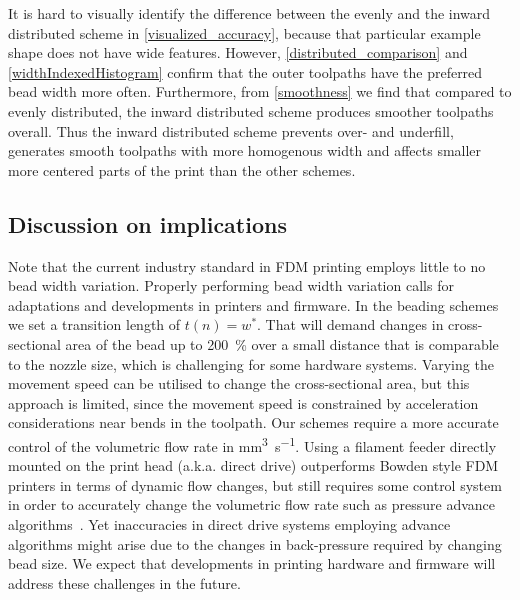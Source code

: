 It is hard to visually identify the difference between the evenly and the inward distributed scheme in \cref{visualized_accuracy}, because that particular example shape does not have wide features.
However, \cref{distributed_comparison} and  \cref{widthIndexedHistogram} confirm that the outer toolpaths have the preferred bead width more often.
Furthermore, from \cref{smoothness} we find that compared to evenly distributed, the inward distributed scheme produces smoother toolpaths overall.
Thus the inward distributed scheme prevents over- and underfill, generates smooth toolpaths with more homogenous width and affects smaller more centered parts of the print than the other schemes. 














\subsection{Discussion on implications}
Note that the current industry standard in FDM printing employs little to no bead width variation.
Properly performing bead width variation calls for adaptations and developments in printers and firmware.
In the beading schemes we set a transition length of $t(n) = w^*$.
That will demand changes in cross-sectional area of the bead up to \SI{200}{\percent} over a small distance that is comparable to the nozzle size, which is challenging for some hardware systems.
Varying the movement speed can be utilised to change the cross-sectional area, but this approach is limited, since the movement speed is constrained by acceleration considerations near bends in the toolpath.
Our schemes require a more accurate control of the volumetric flow rate in \si{\milli\meter\cubed\per\second}.
Using a filament feeder directly mounted on the print head (a.k.a. direct drive) outperforms Bowden style FDM printers in terms of dynamic flow changes,
but still requires some control system in order to accurately change the volumetric flow rate such as pressure advance algorithms~\cite{tronvoll2019investigating}.
Yet inaccuracies in direct drive systems employing advance algorithms might arise due to the changes in back-pressure required by changing bead size.
We expect that developments in printing hardware and firmware will address these challenges in the future.


